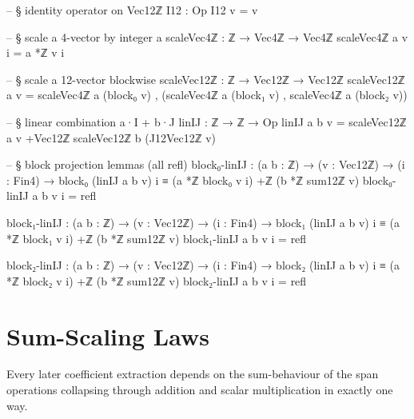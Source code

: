 \documentclass[11pt,a4paper]{book}
\begin{document}
\begin{code}
-- § identity operator on Vec12ℤ
I12 : Op
I12 v = v

-- § scale a 4-vector by integer a
scaleVec4ℤ : ℤ → Vec4ℤ → Vec4ℤ
scaleVec4ℤ a v i = a *ℤ v i

-- § scale a 12-vector blockwise
scaleVec12ℤ : ℤ → Vec12ℤ → Vec12ℤ
scaleVec12ℤ a v = scaleVec4ℤ a (block₀ v) , (scaleVec4ℤ a (block₁ v) , scaleVec4ℤ a (block₂ v))

-- § linear combination a·I + b·J
linIJ : ℤ → ℤ → Op
linIJ a b v = scaleVec12ℤ a v +Vec12ℤ scaleVec12ℤ b (J12Vec12ℤ v)

-- § block projection lemmas (all refl)
block₀-linIJ : (a b : ℤ) → (v : Vec12ℤ) → (i : Fin4) →
  block₀ (linIJ a b v) i ≡ (a *ℤ block₀ v i) +ℤ (b *ℤ sum12ℤ v)
block₀-linIJ a b v i = refl

block₁-linIJ : (a b : ℤ) → (v : Vec12ℤ) → (i : Fin4) →
  block₁ (linIJ a b v) i ≡ (a *ℤ block₁ v i) +ℤ (b *ℤ sum12ℤ v)
block₁-linIJ a b v i = refl

block₂-linIJ : (a b : ℤ) → (v : Vec12ℤ) → (i : Fin4) →
  block₂ (linIJ a b v) i ≡ (a *ℤ block₂ v i) +ℤ (b *ℤ sum12ℤ v)
block₂-linIJ a b v i = refl
\end{code}

\section{Sum-Scaling Laws}

Every later coefficient extraction depends on the sum-behaviour of the span operations
collapsing through addition and scalar multiplication in exactly one way.
\end{document}
